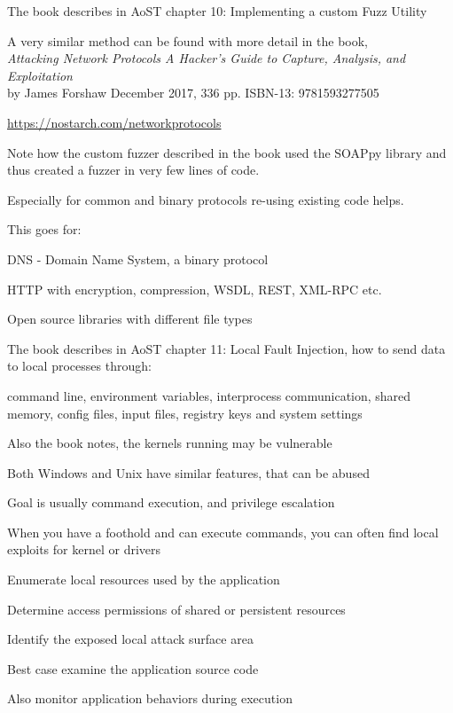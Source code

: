 \documentclass[Screen16to9,17pt]{foils}
\begin{document}

The book describes in AoST chapter 10: Implementing a custom Fuzz Utility

A very similar method can be found with more detail in the book,\\
\emph{Attacking Network Protocols A Hacker's Guide to Capture, Analysis, and Exploitation}\\
by James Forshaw December 2017, 336 pp. ISBN-13: 9781593277505

\url{https://nostarch.com/networkprotocols}


Note how the custom fuzzer described in the book used the SOAPpy library and thus created a fuzzer in very few lines of code.

Especially for common and binary protocols re-using existing code helps.

This goes for:
\begin{list2}
\item DNS - Domain Name System, a binary protocol
\item HTTP with encryption, compression, WSDL, REST, XML-RPC etc.
\item Open source libraries with different file types
\end{list2}



The book describes in AoST chapter 11: Local Fault Injection, how to send data to local processes through:

\begin{list2}
\item command line, environment variables, interprocess communication, shared memory, config files, input files, registry keys and system settings
\item Also the book notes, the kernels running may be vulnerable
\item Both Windows and Unix have similar features, that can be abused
\item Goal is usually command execution, and privilege escalation
\item When you have a foothold and can execute commands, you can often find local exploits for kernel or drivers
\end{list2}


\begin{list2}
\item Enumerate local resources used by the application
\item Determine access permissions of shared or persistent resources
\item Identify the exposed local attack surface area
\item Best case examine the application source code
\item Also monitor application behaviors during execution
\end{list2}
\end{document}
